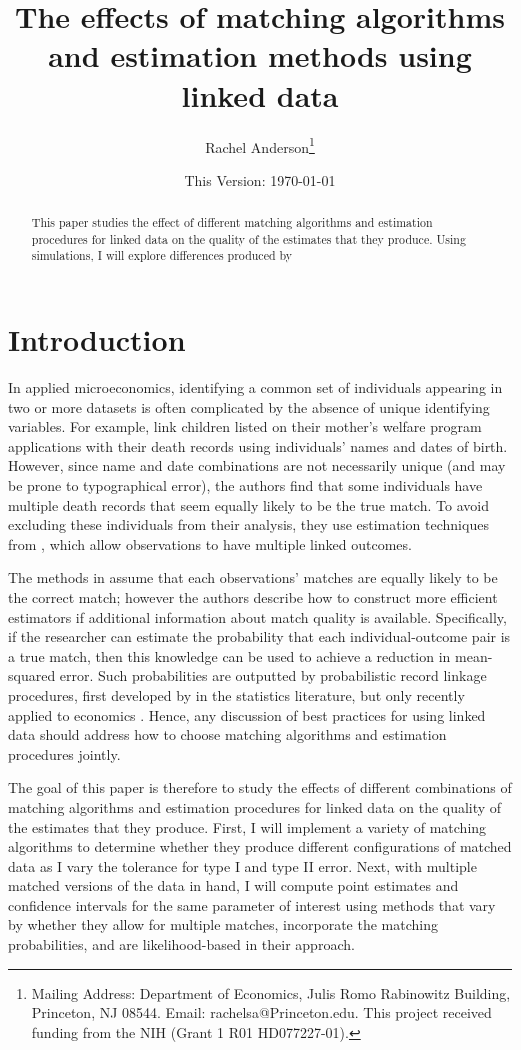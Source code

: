 \documentclass[12pt]{article}
\title{\singlespacing The effects of matching algorithms and estimation methods using linked data}
\author{Rachel Anderson\thanks{Mailing Address: Department of Economics, Julis Romo Rabinowitz Building,
Princeton, NJ 08544. Email: rachelsa@Princeton.edu.
This project received funding from the NIH (Grant 1 R01 HD077227-01). }}
\date{This Version: \today}
\begin{document}
\maketitle


\begin{abstract}
\singlespacing
\noindent This paper studies the effect of different matching algorithms and estimation procedures for linked data on the quality of the estimates that they produce.  Using simulations, I will explore differences produced by  
\end{abstract}

\section{Introduction}
In applied microeconomics, identifying a common set of individuals appearing in two or more datasets is often complicated by the absence of unique identifying variables. For example,  \cite{aizer2016} link children listed on their mother's welfare program applications with their death records using individuals' names and dates of birth.  However, since name and date combinations are not necessarily unique (and may be prone to typographical error), the authors find that some individuals have multiple death records that seem equally likely to be the true match.  To avoid excluding these individuals from their analysis, they use estimation techniques from \cite{ahl2019}, which allow observations to have multiple linked outcomes.  

The methods in \cite{ahl2019} assume that each observations' matches are equally likely to be the correct match; however the authors describe how to construct more efficient estimators if additional information about match quality is available.  Specifically, if the researcher can estimate the probability that each individual-outcome pair is a true match, then this knowledge can be used to achieve a reduction in mean-squared error.  Such probabilities are outputted by probabilistic record linkage procedures, first developed by \cite{fellegi69} in the statistics literature, but only recently applied to economics \cite{arp2018}. Hence, any discussion of best practices for using linked data should address how to choose matching algorithms and estimation procedures jointly.  

The goal of this paper is therefore to study the effects of different combinations of matching algorithms and estimation procedures for linked data on the quality of the estimates that they produce.  First, I will implement a variety of matching algorithms to determine whether they produce different configurations of matched data as I vary the tolerance for type I and type II error.  Next, with multiple matched versions of the data in hand, I will compute point estimates and confidence intervals for the same parameter of interest using methods that vary by whether they allow for multiple matches, incorporate the matching probabilities, and are likelihood-based in their approach. 
\end{document}
